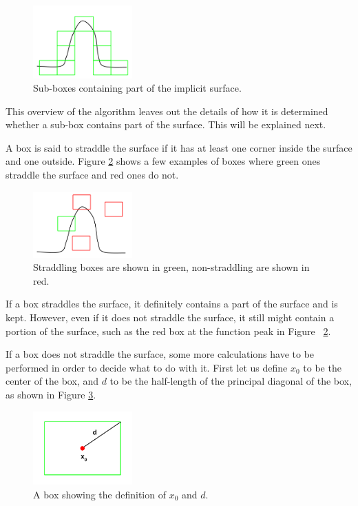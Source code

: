 \documentclass[conference]{acmsiggraph}
\begin{document}
\begin{figure}[ht]
  \centering
  \includegraphics[width=1.5in]{figures/surface_boxes.png}
  \caption{Sub-boxes containing part of the implicit surface.}
  \label{fig:surface_boxes}
\end{figure}

This overview of the algorithm leaves out the details of how it is 
determined whether a sub-box contains part of the surface.  This will
be explained next.

A box is said to straddle the surface if it has at least one corner
inside the surface and one outside.  Figure \ref{fig:straddling_boxes}
shows a few examples of boxes where green ones straddle the surface
and red ones do not.

\begin{figure}[ht]
  \centering
  \includegraphics[width=1.5in]{figures/straddling_boxes.png}
  \caption{Straddling boxes are shown in green, non-straddling are shown in red.}
  \label{fig:straddling_boxes}
\end{figure}

If a box straddles the surface, it definitely contains a part of the 
surface and is kept.  However, even if it does not straddle the surface,
it still might contain a portion of the surface, such as the red box at
the function peak in Figure ~\ref{fig:straddling_boxes}.

If a box does not straddle the surface, some more calculations have to
be performed in order to decide what to do with it.  First let us 
define $x_{0}$ to be the center of the box, and $d$ to be the half-length
of the principal diagonal of the box, as shown in Figure \ref{fig:box}.

\begin{figure}[ht]
  \centering
  \includegraphics[width=1.5in]{figures/box.png}
  \caption{A box showing the definition of $x_0$ and $d$.}
  \label{fig:box}
\end{figure}
\end{document}
